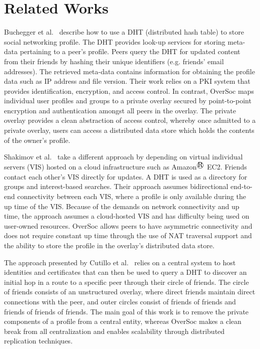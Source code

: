 \section{Related Works}
\label{vpo:background}

Buchegger et al.~\cite{peerson} describe how to use a DHT (distributed hash
table) to store social networking profile.  The DHT provides look-up services
for storing meta-data pertaining to a peer's profile.  Peers query the DHT for
updated content from their friends by hashing their unique identifiers (e.g.
friends' email addresses).  The retrieved meta-data contains information for
obtaining the profile data such as IP address and file version. Their work
relies on a PKI system that provides identification, encryption, and access
control.  In contrast, OverSoc maps individual user profiles and groups to a
private overlay secured by point-to-point encryption and authentication amongst
all peers in the overlay.  The private overlay provides a clean abstraction of
access control, whereby once admitted to a private overlay, users can access a
distributed data store which holds the contents of the owner's profile.

Shakimov et al.~\cite{vis-a-vis} take a different approach by depending on
virtual individual servers (VIS) hosted on a cloud infrastructure such as
Amazon$^\registered$ EC2. Friends contact each other's VIS directly for updates.  A DHT is
used as a directory for groups and interest-based searches. Their approach
assumes bidirectional end-to-end connectivity between each VIS, where a profile
is only available during the up time of the VIS.  Because of the demands on
network connectivity and up time, the approach assumes a cloud-hosted VIS and
has difficulty being used on user-owned resources.  OverSoc allows peers to
have  asymmetric connectivity and does not require constant up time through the
use of NAT traversal support and the ability to store the profile in the
overlay's distributed data store.

The approach presented by Cutillo et al.~\cite{matryoshka} relies on a
central system to host identities and certificates that can then be used to
query a DHT to discover an initial hop in a route to a specific peer through
their circle of friends.  The circle of friends consists of an unstructured
overlay, where direct friends maintain direct connections with the peer, and
outer circles consist of friends of friends and friends of friends of friends.
The main goal of this work is to remove the private components of a profile
from a central entity, whereas OverSoc makes a clean break from all
centralization and enables scalability through distributed replication
techniques.

